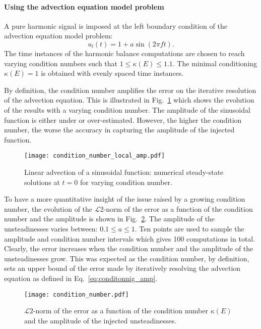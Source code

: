 
\paragraph{Using the advection equation model problem}

A pure harmonic signal is imposed at the left boundary condition
of the advection equation model problem:
\begin{equation}
   u_l (t) = 1 + a \sin \left(2 \pi f t\right).
\end{equation}
The time instances of the harmonic balance
computations are chosen to reach varying condition numbers
such that $1 \leq \kappa (E) \leq 1.1$.  
The minimal conditioning
$\kappa(E) = 1$ is obtained with evenly spaced time instances.

By definition, the condition number amplifies the error 
on the iterative resolution of the advection equation.
This is illustrated in Fig.~\ref{fig:condition_number_local_amp} which 
shows the evolution of the results with a varying condition number.
The amplitude of the
sinusoidal function is either under or over-estimated. However, 
the higher the condition number, the worse the accuracy in capturing
the amplitude of the injected function.
\begin{figure}[htbp]
  \centering
  \texttt{[image: condition\_number\_local\_amp.pdf]}
  \caption{Linear advection of a sinusoidal function: numerical steady-state 
  solutions at $t=0$ for varying condition number.}
  \label{fig:condition_number_local_amp}
\end{figure}

To have a more quantitative insight of the issue raised by a 
growing condition number, the evolution of the
$\mathcal{L}2$-norm of the error as a function of the condition
number and the amplitude is shown in Fig.~\ref{fig:condition_number}.
The amplitude of the unsteadinesses varies between: $0.1 \leq a \leq 1$.
Ten points are used to sample the amplitude and condition number intervals
which gives 100 computations in total.
Clearly, the error increases
when the condition number and the amplitude of the
unsteadinesses grow. This was expected as the condition
number, by definition, sets an upper bound of
the error made by iteratively resolving the advection equation
as defined in Eq.~\eqref{eq:conditonnig_amp}.
\begin{figure}[htb]
  \centering
  \texttt{[image: condition\_number.pdf]}
  \caption{$\mathcal{L}2$-norm of the error as a function of the condition number
  $\kappa(E)$ and the amplitude of the injected unsteadinesses.}
  \label{fig:condition_number}
\end{figure}


